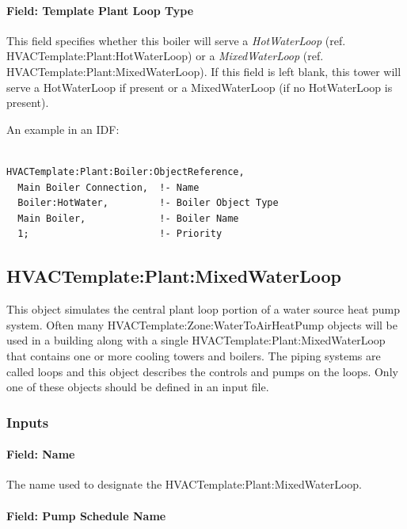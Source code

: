 \paragraph{Field: Template Plant Loop Type}\label{field-template-plant-loop-type-3}

This field specifies whether this boiler will serve a \emph{HotWaterLoop} (ref. HVACTemplate:Plant:HotWaterLoop) or a \emph{MixedWaterLoop} (ref. HVACTemplate:Plant:MixedWaterLoop). If this field is left blank, this tower will serve a HotWaterLoop if present or a MixedWaterLoop (if no HotWaterLoop is present).

An example in an IDF:

\begin{lstlisting}

HVACTemplate:Plant:Boiler:ObjectReference,
  Main Boiler Connection,  !- Name
  Boiler:HotWater,         !- Boiler Object Type
  Main Boiler,             !- Boiler Name
  1;                       !- Priority
\end{lstlisting}

\subsection{HVACTemplate:Plant:MixedWaterLoop}\label{hvactemplateplantmixedwaterloop}

This object simulates the central plant loop portion of a water source heat pump system. Often many HVACTemplate:Zone:WaterToAirHeatPump objects will be used in a building along with a single HVACTemplate:Plant:MixedWaterLoop that contains one or more cooling towers and boilers. The piping systems are called loops and this object describes the controls and pumps on the loops. Only one of these objects should be defined in an input file.

\subsubsection{Inputs}\label{inputs-31-000}

\paragraph{Field: Name}\label{field-name-18-002}

The name used to designate the HVACTemplate:Plant:MixedWaterLoop.

\paragraph{Field: Pump Schedule Name}\label{field-pump-schedule-name-2}

